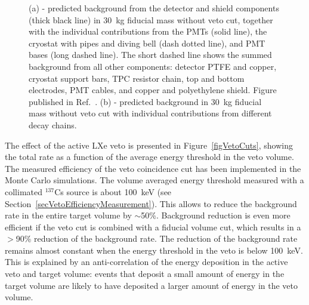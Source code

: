 \begin{figure}[!b]
\centering
{}
\caption[Contribution to the background from different components and decay chains]{(a) - predicted background from the detector and shield components (thick black line) in 30~kg fiducial mass without veto cut, together with the individual contributions from the PMTs (solid line), the cryostat with pipes and diving bell (dash dotted line), and PMT bases (long dashed line). The short dashed line shows the summed background from all other components: detector PTFE and copper, cryostat support bars, TPC resistor chain, top and bottom electrodes, PMT cables, and copper and polyethylene shield. Figure published in Ref.~\cite{EMBG}. (b) - predicted background in 30~kg fiducial mass without veto cut with individual contributions from different decay chains.}
\label{figSpectraDetectorMaterials}
\end{figure}

The effect of the active LXe veto is presented in Figure~\ref{figVetoCuts}, showing the total rate as a function of the average energy threshold in the veto volume.
The measured efficiency of the veto coincidence cut has been implemented in the Monte Carlo simulations. The volume averaged energy threshold measured with a collimated $^{137}$Cs source is about 100~keV (see Section~\ref{secVetoEfficiencyMeasurement}). This allows to reduce the background rate in the entire target volume by $\sim$50\%. Background reduction is even more efficient if the veto cut is combined with a fiducial volume cut, which results in a $>$90\% reduction of the background rate. The reduction of the background rate remains almost constant when the energy threshold in the veto is below 100~keV. This is explained by an anti-correlation of the energy deposition in the active veto and target volume: events that deposit a small amount of energy in the target volume are likely to have deposited a larger amount of energy in the veto volume.


